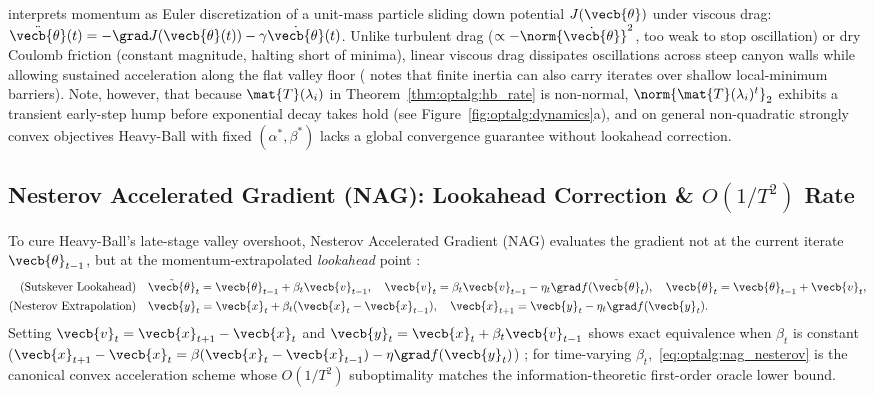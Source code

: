 \documentclass[../../../../master.tex]{subfiles}
\begin{document}
\begin{intuition}
 interprets momentum as Euler discretization of a unit-mass particle sliding down potential $J(\vecb{\theta})$ under viscous drag: $\ddot{\vecb{\theta}}(t) = -\grad J(\vecb{\theta}(t)) - \gamma\dot{\vecb{\theta}}(t)$. Unlike turbulent drag ($\propto -\norm{\dot{\vecb{\theta}}}^2$, too weak to stop oscillation) or dry Coulomb friction (constant magnitude, halting short of minima), linear viscous drag dissipates oscillations across steep canyon walls while allowing sustained acceleration along the flat valley floor ( notes that finite inertia can also carry iterates over shallow local-minimum barriers). Note, however, that because $\mat{T}(\lambda_i)$ in Theorem~\ref{thm:optalg:hb_rate} is non-normal, $\norm{\mat{T}(\lambda_i)^t}_2$ exhibits a transient early-step hump before exponential decay takes hold (see Figure~\ref{fig:optalg:dynamics}a), and on general non-quadratic strongly convex objectives Heavy-Ball with fixed $(\alpha^*,\beta^*)$ lacks a global convergence guarantee without lookahead correction.
\end{intuition}

\subsection{Nesterov Accelerated Gradient (NAG): Lookahead Correction \& \texorpdfstring{$O(1/T^2)$}{O(1/T\texttwosuperior)} Rate}
\label{subsec:optalg:nesterov}

To cure Heavy-Ball's late-stage valley overshoot, Nesterov Accelerated Gradient (NAG) evaluates the gradient not at the current iterate $\vecb{\theta}_{t-1}$, but at the momentum-extrapolated \emph{lookahead} point   :
\begin{align}
\text{(Sutskever Lookahead)}\quad & \tilde{\vecb{\theta}}_t = \vecb{\theta}_{t-1} + \beta_t \vecb{v}_{t-1},\quad \vecb{v}_t = \beta_t \vecb{v}_{t-1} - \eta_t \grad f(\tilde{\vecb{\theta}}_t),\quad \vecb{\theta}_t = \vecb{\theta}_{t-1} + \vecb{v}_t, \label{eq:optalg:nag_sutskever} \\
\text{(Nesterov Extrapolation)}\quad & \vecb{y}_t = \vecb{x}_t + \beta_t(\vecb{x}_t - \vecb{x}_{t-1}),\quad \vecb{x}_{t+1} = \vecb{y}_t - \eta_t \grad f(\vecb{y}_t). \label{eq:optalg:nag_nesterov}
\end{align}
Setting $\vecb{v}_t = \vecb{x}_{t+1} - \vecb{x}_t$ and $\vecb{y}_t = \vecb{x}_t + \beta_t \vecb{v}_{t-1}$ shows exact equivalence when $\beta_t$ is constant ($\vecb{x}_{t+1} - \vecb{x}_t = \beta(\vecb{x}_t - \vecb{x}_{t-1}) - \eta\grad f(\vecb{y}_t)$) ; for time-varying $\beta_t$,~\eqref{eq:optalg:nag_nesterov} is the canonical convex acceleration scheme whose $O(1/T^2)$ suboptimality matches the information-theoretic first-order oracle lower bound.
\end{document}
